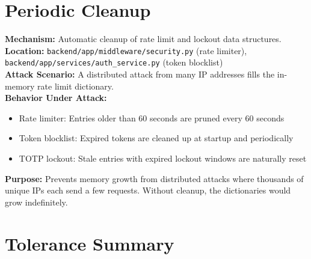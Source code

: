 \documentclass[11pt,a4paper]{article}
\begin{document}
\section{Periodic Cleanup}

\begin{tcolorbox}[colback=toleranceamber!5, colframe=toleranceamber]
\textbf{Mechanism:} Automatic cleanup of rate limit and lockout data structures.\\
\textbf{Location:} \texttt{backend/app/middleware/security.py} (rate limiter), \texttt{backend/app/services/auth\_service.py} (token blocklist)\\
\textbf{Attack Scenario:} A distributed attack from many IP addresses fills the in-memory rate limit dictionary.\\
\textbf{Behavior Under Attack:}
\begin{itemize}[nosep]
  \item Rate limiter: Entries older than 60 seconds are pruned every 60 seconds
  \item Token blocklist: Expired tokens are cleaned up at startup and periodically
  \item TOTP lockout: Stale entries with expired lockout windows are naturally reset
\end{itemize}
\textbf{Purpose:} Prevents memory growth from distributed attacks where thousands of unique IPs each send a few requests. Without cleanup, the dictionaries would grow indefinitely.
\end{tcolorbox}

\section{Tolerance Summary}
\end{document}
